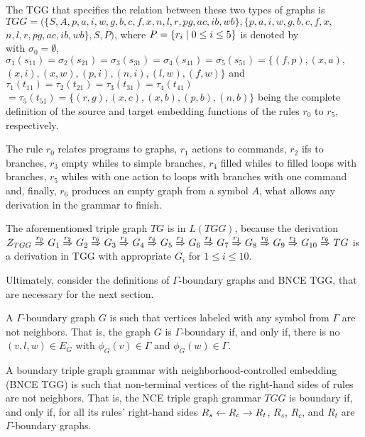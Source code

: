 \documentclass[runningheads]{llncs}
\begin{document}
\begin{example}
	
	
	The TGG that specifies the relation between these two types of graphs is $\mathit{TGG} = (\{S, A, p, a, i, w, g, b, c, f, x, n, l, r, \mathit{pg}, \mathit{ac}, \mathit{ib}, \mathit{wb}\}, \{p, a, i, w, g, b, c, f, x,$ $ n, l, r, \mathit{pg}, \mathit{ac}, \mathit{ib}, \mathit{wb}\}, S, P)$, where $P = \{r_i \; | \; 0 \le i \le 5\}$ is denoted by\\
	
	
	\noindent
	with $\sigma_0 = \emptyset$, $\sigma_1(s_{11}) = \sigma_2(s_{21}) = \sigma_3(s_{31}) = \sigma_4(s_{41}) =\sigma_5(s_{51}) = \{ (f,p), (x,a), $ $(x,i), (x,w), (p,i), (n,i), (l,w), (f,w) \}$ and $\tau_1(t_{11}) = \tau_2(t_{21}) = \tau_3(t_{31}) = \tau_4(t_{41}) $ $= \tau_5(t_{51}) = \{ (r,g), (x,c), (x,b), (p,b), (n,b)\}$ being the complete definition of the source and target embedding functions of the rules $r_0$ to $r_5$, respectively.
	
	The rule $r_0$ relates programs to graphs, $r_1$ actions to commands, $r_2$ ifs to branches, $r_3$ empty whiles to simple branches, $r_4$ filled whiles to filled loops with branches, $r_5$ whiles with one action to loops with branches with one command and, finally, $r_6$ produces an empty graph from a symbol $A$, what allows any derivation in the grammar to finish.
	
	The aforementioned triple graph $\mathit{TG}$ is in $L(\mathit{TGG})$, because the derivation
	$
	\startTG{TGG} \tderiv{r_0}{}{} G_1 \tderiv{r_2}{}{} G_2 \tderiv{r_6}{}{} G_3 \tderiv{r_1}{}{} G_4 \tderiv{r_6}{}{} G_5 \tderiv{r_1}{}{} G_6 \tderiv{r_4}{}{} G_7 \tderiv{r_1}{}{} G_8 \tderiv{r_6}{}{} G_9 \tderiv{r_1}{}{} G_{10} \tderiv{r_6}{}{} TG
	$
	is a derivation in TGG with appropriate $G_i$ for $1 \le i \le 10$.
\end{example}

Ultimately, consider the definitions of $\Gamma\text{-boundary}$ graphs and BNCE TGG, that are necessary for the next section.

\begin{definition}
	A $\Gamma\text{-boundary}$ graph $G$ is such that vertices labeled with any symbol from $\Gamma$ are not neighbors. That is, the graph $G$ is $\Gamma\text{-boundary}$ if, and only if, there is no $(v,l,w) \in E_G$ with $\phi_G(v) \in \Gamma$ and $\phi_G(w) \in \Gamma$.
\end{definition}

\begin{definition}
	\label{def:bncetgg}
	A boundary triple graph grammar with neighborhood-controlled embedding (BNCE TGG) is such that non-terminal vertices of the right-hand sides of rules are not neighbors. That is, the NCE triple graph grammar $\mathit{TGG}$ is boundary if, and only if, for all its rules' right-hand sides $R_s \overset{}{\leftarrow} R_c \overset{}{\rightarrow} R_t$, $R_s$, $R_c$, and $R_t$ are $\Gamma\text{-boundary}$ graphs.
\end{definition}
\end{document}
